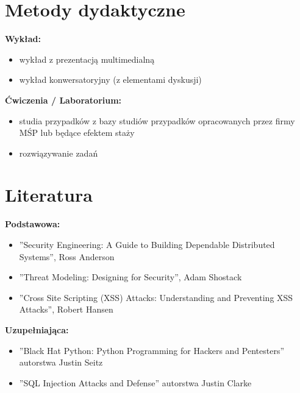 \documentclass[12pt, a4paper]{article}
\begin{document}
\section{Metody dydaktyczne}

\textbf{Wykład:}
\begin{itemize}
  \item wykład z prezentacją multimedialną
  \item wykład konwersatoryjny (z elementami dyskusji)
\end{itemize}
\vspace{4pt}
\textbf{Ćwiczenia / Laboratorium:}
\begin{itemize}
  \item studia przypadków z bazy studiów przypadków opracowanych przez firmy MŚP lub będące efektem staży
  \item rozwiązywanie zadań
\end{itemize}
\vspace{4pt}


\section{Literatura}

\textbf{Podstawowa:}
\begin{itemize}
  \item ''Security Engineering: A Guide to Building Dependable Distributed Systems”, Ross Anderson
  \item ''Threat Modeling: Designing for Security'', Adam Shostack
  \item ''Cross Site Scripting (XSS) Attacks: Understanding and Preventing XSS Attacks'', Robert Hansen
\end{itemize}

\textbf{Uzupełniająca:}
\begin{itemize}
  \item ''Black Hat Python: Python Programming for Hackers and Pentesters'' autorstwa Justin Seitz
  \item ''SQL Injection Attacks and Defense'' autorstwa Justin Clarke
\end{itemize}
\end{document}
